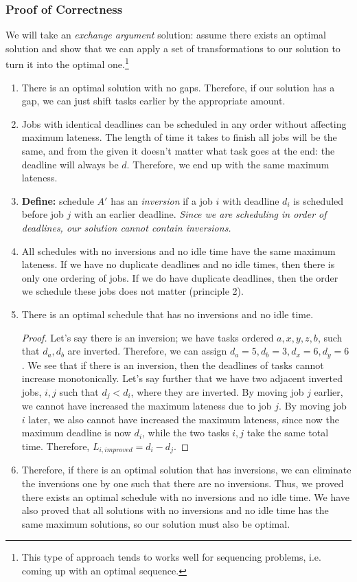 \documentclass[11pt]{article}
\begin{document}
\subsubsection{Proof of Correctness}
We will take an \textit{exchange argument} solution: assume there exists an optimal solution and show that we can apply a set of transformations to our solution to turn it into the optimal one.\footnote{This type of approach tends to works well for sequencing problems, i.e. coming up with an optimal sequence.}
\begin{enumerate}
    \item There is an optimal solution with no gaps. Therefore, if our solution has a gap, we can just shift tasks earlier by the appropriate amount.
    \item Jobs with identical deadlines can be scheduled in any order without affecting maximum lateness. The length of time it takes to finish all jobs will be the same, and from the given it doesn't matter what task goes at the end: the deadline will always be $d$. Therefore, we end up with the same maximum lateness.
    \item \textbf{Define:} schedule $A'$ has an \textit{inversion} if a job $i$ with deadline $d_i$ is scheduled before job $j$ with an earlier deadline. \textit{Since we are scheduling in order of deadlines, our solution cannot contain inversions.}
    \item All schedules with no inversions and no idle time have the same maximum lateness. If we have no duplicate deadlines and no idle times, then there is only one ordering of jobs. If we do have duplicate deadlines, then the order we schedule these jobs does not matter (principle 2). 
    \item There is an optimal schedule that has no inversions and no idle time.
        \begin{proof}
        Let's say there is an inversion; we have tasks ordered $a,x,y,z,b$, such that $d_a, d_b$ are inverted. Therefore, we can assign $d_a = 5, d_b = 3, d_x = 6, d_y = 6$. We see that if there is an inversion, then the deadlines of tasks cannot increase monotonically. Let's say further that we have two adjacent inverted jobs, $i,j$ such that $d_j < d_i$, where they are inverted. By moving job $j$ earlier, we cannot have increased the maximum lateness due to job $j$. By moving job $i$ later, we also cannot have increased the maximum lateness, since now the maximum deadline is now $d_i$, while the two tasks $i,j$ take the same total time. Therefore, $L_{i, improved} = d_i - d_j$. 
        \end{proof}
    \item Therefore, if there is an optimal solution that has inversions, we can eliminate the inversions one by one such that there are no inversions. Thus, we proved there exists an optimal schedule with no inversions and no idle time. We have also proved that all solutions with no inversions and no idle time has the same maximum solutions, so our solution must also be optimal.
\end{enumerate}
\end{document}
